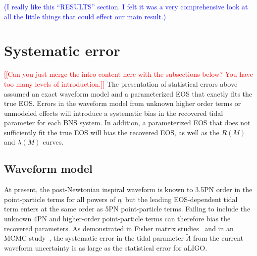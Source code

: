 \documentclass[twocolumn,prd,amssymb,aps,nofootinbib,showpacs,epsf]{revtex4}
\newcommand\ben[2]{\textcolor{red}{{#1}\sout{#2}}}
\newcommand\les[2]{\textcolor{blue}{{#1}\sout{#2}}}
\begin{document}
\les{(I really like this ``RESULTS'' section.  I felt it was a very comprehensive look at all the little things that could effect our main result.)}{}

\section{Systematic error}
\label{sec:systematic}

\ben{[[Can you just merge the intro content here with the subsections below? You have too many levels of introduction.]]}{}
The presentation of statistical errors above assumed an exact waveform model and a parameterized EOS that exactly fits the true EOS. Errors in the waveform model from unknown higher order terms or unmodeled effects will introduce a systematic bias in the recovered tidal parameter for each BNS system. In addition, a parameterized EOS that does not sufficiently fit the true EOS will bias the recovered EOS, as well as the $R(M)$ and $\lambda(M)$ curves.

\subsection{Waveform model}

At present, the post-Newtonian inspiral waveform is known to 3.5PN order in the point-particle terms for all powers of $\eta$, but the leading EOS-dependent tidal term enters at the same order as 5PN point-particle terms. Failing to include the unknown 4PN and higher-order point-particle terms can therefore bias the recovered parameters. As demonstrated in Fisher matrix studies~\cite{Favata2014, YagiYunes2014} and in an MCMC study~\cite{WadeCreightonOchsner2014}, the systematic error in the tidal parameter $\tilde\Lambda$ from the current waveform uncertainty is as large as the statistical error for aLIGO. 
\end{document}
